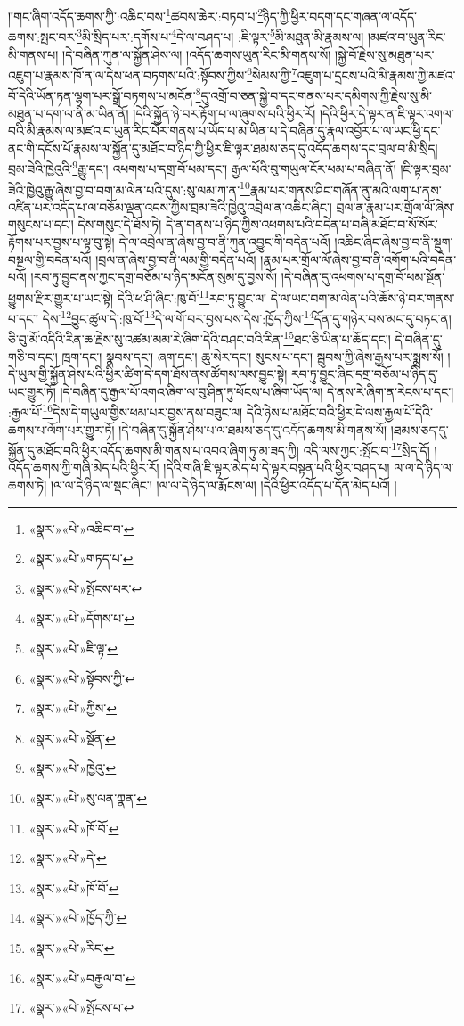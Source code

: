 །།གང་ཞིག་འདོད་ཆགས་ཀྱི་:འཆིང་བས་\footnote{«སྣར་»«པེ་»འཆིང་བ་}ཚབས་ཆེར་:བཏབ་པ་\footnote{«སྣར་»«པེ་»གཏད་པ་}ཉིད་ཀྱི་ཕྱིར་བདག་དང་གཞན་ལ་འདོད་ཆགས་:སྤང་བར་\footnote{«སྣར་»«པེ་»སྤོངས་པར་}མི་སྲིད་པར་:དགོས་པ་\footnote{«སྣར་»«པེ་»དོགས་པ་}དེ་ལ་བཤད་པ། :ཇི་ལྟར་\footnote{«སྣར་»«པེ་»ཇི་ལྟ་}མི་མཐུན་མི་རྣམས་ལ། །མཛའ་བ་ཡུན་རིང་མི་གནས་པ། །དེ་བཞིན་ཀུན་ལ་སྐྱོན་ཤེས་ལ། །འདོད་ཆགས་ཡུན་རིང་མི་གནས་སོ། །སྐྱེ་བོ་རྗེས་སུ་མཐུན་པར་འཇུག་པ་རྣམས་ཁོ་ན་ལ་དེས་ཕན་བཏགས་པའི་:སྟོབས་ཀྱིས་\footnote{«སྣར་»«པེ་»སྟོབས་ཀྱི་}སེམས་ཀྱི་\footnote{«སྣར་»«པེ་»ཀྱིས་}འཇུག་པ་དྲངས་པའི་མི་རྣམས་ཀྱི་མཛའ་བོ་དེའི་ཡོན་ཏན་ལྷག་པར་སྒྲོ་བཏགས་པ་མངོན་\footnote{«སྣར་»«པེ་»སྔོན་}དུ་འགྲོ་བ་ཅན་སྐྱེ་བ་དང་གནས་པར་དམིགས་ཀྱི་རྗེས་སུ་མི་མཐུན་པ་དག་ལ་ནི་མ་ཡིན་ནོ། །དེའི་སྐྱོན་ཉེ་བར་རྟོག་པ་ལ་ཞུགས་པའི་ཕྱིར་རོ། །དེའི་ཕྱིར་དེ་ལྟར་ན་ཇི་ལྟར་འགལ་བའི་མི་རྣམས་ལ་མཛའ་བ་ཡུན་རིང་པོར་གནས་པ་ཡོད་པ་མ་ཡིན་པ་དེ་བཞིན་དུ་རྣལ་འབྱོར་པ་ལ་ཡང་ཕྱི་དང་ནང་གི་དངོས་པོ་རྣམས་ལ་སྐྱོན་དུ་མཐོང་བ་ཉིད་ཀྱི་ཕྱིར་ཇི་ལྟར་ཐམས་ཅད་དུ་འདོད་ཆགས་དང་བྲལ་བ་མི་སྲིད། བྲམ་ཟེའི་ཁྱེའུའི་\footnote{«སྣར་»«པེ་»ཁྱེའུ་}རྒྱུ་དང་། འཕགས་པ་དགྲ་བོ་ཕམ་དང་། རྒྱལ་པོའི་བུ་གཡུལ་ངོར་ཕམ་པ་བཞིན་ནོ། །ཇི་ལྟར་བྲམ་ཟེའི་ཁྱེའུ་རྒྱུ་ཞེས་བྱ་བ་བག་མ་ལེན་པའི་དུས་:སུ་ལམ་ཀ་ན་\footnote{«སྣར་»«པེ་»སུ་ལན་ཀྣན་}རྣམ་པར་གནས་ཤིང་གཞོན་ནུ་མའི་ལག་པ་ནས་འཛིན་པར་འདོད་པ་ལ་བཅོམ་ལྡན་འདས་ཀྱིས་བྲམ་ཟེའི་ཁྱེའུ་འབྲེལ་ན་འཆིང་ཞིང་། བྲལ་ན་རྣམ་པར་གྲོལ་ལོ་ཞེས་གསུངས་པ་དང་། དེས་གསུང་དེ་ཐོས་ཏེ། དེ་ན་གནས་པ་ཉིད་ཀྱིས་འཕགས་པའི་བདེན་པ་བཞི་མཐོང་བ་སོ་སོར་རྟོགས་པར་བྱས་པ་ལྟ་བུ་སྟེ། དེ་ལ་འབྲེལ་ན་ཞེས་བྱ་བ་ནི་ཀུན་འབྱུང་གི་བདེན་པའོ། །འཆིང་ཞིང་ཞེས་བྱ་བ་ནི་སྡུག་བསྔལ་གྱི་བདེན་པའོ། །བྲལ་ན་ཞེས་བྱ་བ་ནི་ལམ་གྱི་བདེན་པའོ། །རྣམ་པར་གྲོལ་ལོ་ཞེས་བྱ་བ་ནི་འགོག་པའི་བདེན་པའོ། །རབ་ཏུ་བྱུང་ནས་ཀྱང་དགྲ་བཅོམ་པ་ཉིད་མངོན་སུམ་དུ་བྱས་སོ། །དེ་བཞིན་དུ་འཕགས་པ་དགྲ་བོ་ཕམ་སྔོན་ཕྱུགས་རྫིར་གྱུར་པ་ཡང་སྟེ། དེའི་ཕ་ཤི་ཞིང་:ཁུ་བོ་\footnote{«སྣར་»«པེ་»ཁོ་བོ་}རབ་ཏུ་བྱུང་ལ། དེ་ལ་ཡང་བག་མ་ལེན་པའི་ཆོས་ཉེ་བར་གནས་པ་དང་། དེས་\footnote{«སྣར་»«པེ་»དེ་}བྱུང་ཚུལ་དེ་:ཁུ་བོ་\footnote{«སྣར་»«པེ་»ཁོ་བོ་}དེ་ལ་གོ་བར་བྱས་པས་དེས་:ཁྱོད་ཀྱིས་\footnote{«སྣར་»«པེ་»ཁྱོད་ཀྱི་}དོན་དུ་གཉེར་བས་མང་དུ་བཏང་ན། ཅི་བུ་མོ་འདིའི་རིན་ཆ་རྗེས་སུ་འཚམ་མམ་རེ་ཞིག་དེའི་བཤང་བའི་རིན་\footnote{«སྣར་»«པེ་»རིང་}ཐང་ཅི་ཡིན་པ་ཆོད་དང་། དེ་བཞིན་དུ་གཅི་བ་དང་། ཁྲག་དང་། སྣབས་དང་། ཞག་དང་། ཆུ་སེར་དང་། སུངས་པ་དང་། སྦུབས་ཀྱི་ཞེས་རྒྱས་པར་སྨྲས་སོ། །དེ་ཡུལ་གྱི་སྐྱོན་ཤེས་པའི་ཕྱིར་ཚིག་དེ་དག་ཐོས་ནས་ཚོགས་ལས་བྱུང་སྟེ། རབ་ཏུ་བྱུང་ཞིང་དགྲ་བཅོམ་པ་ཉིད་དུ་ཡང་གྱུར་ཏོ། །དེ་བཞིན་དུ་རྒྱལ་པོ་འགའ་ཞིག་ལ་བུ་ཤིན་ཏུ་ཕོངས་པ་ཞིག་ཡོད་ལ། དེ་ནས་རེ་ཞིག་ན་རེངས་པ་དང་། :རྒྱལ་པོ་\footnote{«སྣར་»«པེ་»བརྒྱལ་བ་}དེས་དེ་གཡུལ་གྱིས་ཕམ་པར་བྱས་ནས་བཟུང་ལ། དེའི་ཉེས་པ་མཐོང་བའི་ཕྱིར་དེ་ལས་རྒྱལ་པོ་དེའི་ཆགས་པ་ལོག་པར་གྱུར་ཏོ། །དེ་བཞིན་དུ་སྐྱོན་ཤེས་པ་ལ་ཐམས་ཅད་དུ་འདོད་ཆགས་མི་གནས་སོ། །ཐམས་ཅད་དུ་སྐྱོན་དུ་མཐོང་བའི་ཕྱིར་འདོད་ཆགས་མི་གནས་པ་འབའ་ཞིག་ཏུ་མ་ཟད་ཀྱི། འདི་ལས་ཀྱང་:སྤོང་བ་\footnote{«སྣར་»«པེ་»སྤོངས་པ་}སྲིད་དོ། །འདོད་ཆགས་ཀྱི་གཞི་མེད་པའི་ཕྱིར་རོ། །དེའི་གཞི་ཇི་ལྟར་མེད་པ་དེ་ལྟར་བསྟན་པའི་ཕྱིར་བཤད་པ། ལ་ལ་དེ་ཉིད་ལ་ཆགས་ཏེ། །ལ་ལ་དེ་ཉིད་ལ་སྡང་ཞིང་། །ལ་ལ་དེ་ཉིད་ལ་རྨོངས་ལ། །དེའི་ཕྱིར་འདོད་པ་དོན་མེད་པའོ། །
